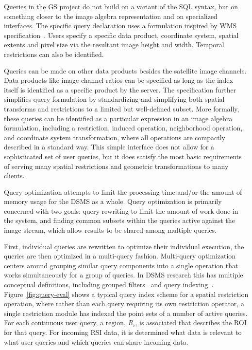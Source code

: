 \documentclass{ucdthesis}       %
\begin{document}
Queries in the \ac{GS} project do not build on a variant of the SQL
syntax, but on something closer to the image algebra representation
and on specialized interfaces.  The specific query declaration uses a
formulation inspired by \ac{WMS} specification~\cite{openg04web-map}.
Users specify a specific data product, coordinate system, spatial
extents and pixel size via the resultant image height and width.
Temporal restrictions can also be identified.

Queries can be made on other data products besides the satellite image
channels.  Data products like image channel ratios can be specified as
long as the index itself is identified as a specific product by the
server.  The specification further simplifies query formulation by
standardizing and simplifying both spatial transforms and restrictions
to a limited but well-defined subset.  More formally, these queries
can be identified as a particular expression in an image algebra
formulation, including a restriction, induced operation, neighborhood
operation, and coordinate system transformation, where all operations
are compactly described in a standard way.  This simple interface does
not allow for a sophisticated set of user queries, but it does satisfy
the most basic requirements of serving many spatial restrictions and
geometric transformations to many clients.

Query optimization attempts to limit the processing time and/or the
amount of memory usage for the \ac{DSMS} as a whole.  Query
optimization is primarily concerned with two goals: query rewriting to
limit the amount of work done in the system, and finding common
subsets within the queries active against the image stream, which
allow results to be shared among multiple queries.

First, individual queries are rewritten to optimize their individual
execution, the queries are then optimized in a multi-query fashion.
Multi-query optimization centers around grouping similar query
components into a single operation that works simultaneously for a
group of queries.  In \ac{DSMS} research this has multiple conceptual
definitions, including grouped filters~\cite{madden02contin-adapt} and
query indexing~\cite{prabhakar02qindex}.  Figure~\ref{fig:query-eval}
shows a typical query index scheme for a spatial restriction
operation, where rather than each query requiring its own restriction
operator, a single restriction module has indexed the point sets of a
number of active queries.  For each continuous user query, a region,
$R_i$, is associated that describes the \acf{ROI} for that query.  For
incoming \ac{RSI} data, it is determined what data is relevant to what
user queries and which queries can share incoming data.
\end{document}
